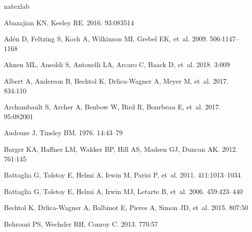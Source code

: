 \documentclass[a4paper]{ar-1col}
\begin{document}
\begin{thebibliography}{}
\expandafter\ifx\csname natexlab\endcsname\relax\def\natexlab#1{#1}\fi

{Abazajian} KN, {Keeley} RE. 2016.
\textit{\prd} 93:083514

{Ad{\'e}n} D, {Feltzing} S, {Koch} A, {Wilkinson} MI, {Grebel} EK, et~al. 2009.
\textit{\aap} 506:1147--1168

{Ahnen} ML, {Ansoldi} S, {Antonelli} LA, {Arcaro} C, {Baack} D, et~al. 2018.
\textit{\jcap} 3:009

{Albert} A, {Anderson} B, {Bechtol} K, {Drlica-Wagner} A, {Meyer} M, et~al.
  2017.
\textit{\apj} 834:110

{Archambault} S, {Archer} A, {Benbow} W, {Bird} R, {Bourbeau} E, et~al. 2017.
\textit{\prd} 95:082001

{Audouze} J, {Tinsley} BM. 1976.
\textit{\araa} 14:43--79

{Barger} KA, {Haffner} LM, {Wakker} BP, {Hill} AS, {Madsen} GJ, {Duncan} AK.
  2012.
\textit{\apj} 761:145

{Battaglia} G, {Tolstoy} E, {Helmi} A, {Irwin} M, {Parisi} P, et~al. 2011.
\textit{\mnras} 411:1013--1034

{Battaglia} G, {Tolstoy} E, {Helmi} A, {Irwin} MJ, {Letarte} B, et~al. 2006.
\textit{\aap} 459:423--440

{Bechtol} K, {Drlica-Wagner} A, {Balbinot} E, {Pieres} A, {Simon} JD, et~al.
  2015.
\textit{\apj} 807:50

{Behroozi} PS, {Wechsler} RH, {Conroy} C. 2013.
\textit{\apj} 770:57


\end{thebibliography}
\end{document}
